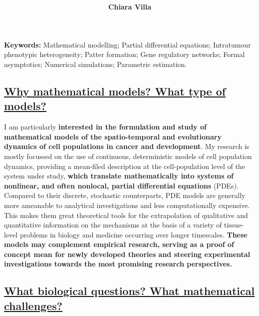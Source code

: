 \documentclass[10pt]{extarticle}
\title{\vspace{-1.2cm}\textbf{\tblue{
Mathematical modelling of cell population dynamics \vspace{-0.3cm}}}}%
\author{\vspace{-0.5cm}\textbf{Chiara Villa}}
\date{}
\def\tblue#1{\textcolor{ultramarine}{#1}}
\def\hlt#1{\textbf{#1}}
\def\titb#1{\underline{#1}}
\begin{document}
\maketitle
\thispagestyle{firstpage}

\vspace{-0.7cm}
\textbf{Keywords:} Mathematical modelling; Partial differential equations; Intratumour phenotypic heterogeneity;  Patter formation; Gene regulatory networks; Formal asymptotics; Numerical simulations; Parametric estimation. %


\vspace{-0.5cm}
\tblue{\subsection*{\titb{Why mathematical models? What type of models?}}}
I am particularly \hlt{interested in the formulation and study of mathematical models of the spatio-temporal and evolutionary dynamics of cell populations in cancer and development}. 
My research is mostly focussed on the use of continuous, deterministic models of cell population dynamics, providing a mean-filed description at the cell-population level of the system under study, \hlt{which translate mathematically into systems of nonlinear, and often nonlocal, partial differential equations} (PDEs).  
Compared to their discrete, stochastic counterparts, PDE models are generally more ameanable to analytical investigations and less computationally expensive.  This makes them great theoretical tools for the extrapolation of qualitative and quantitative information on the mechanisms at the basis of a variety of tissue-level problems in biology and medicine occurring over longer timescales. %
\hlt{These models may complement empirical research, serving as a proof of concept mean for newly developed theories and steering experimental investigations towards the most promising research perspectives. }

\vspace{-0.5cm}
\tblue{\subsection*{\titb{What biological questions? What mathematical challenges?}}}
\end{document}
